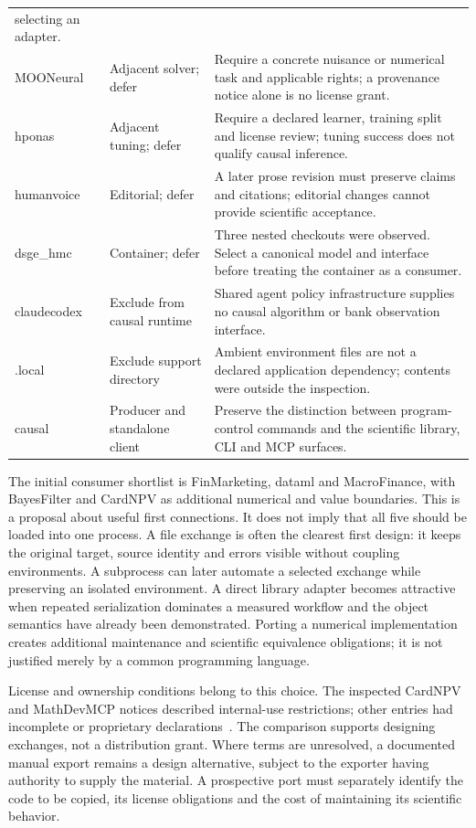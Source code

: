 \begin{longtable}{p{.21\linewidth}p{.23\linewidth}p{.47\linewidth}}
selecting an adapter. \\
MOONeural & Adjacent solver; defer & Require a concrete nuisance or numerical
task and applicable rights; a provenance notice alone is no license grant. \\
hponas & Adjacent tuning; defer & Require a declared learner, training split
and license review; tuning success does not qualify causal inference. \\
humanvoice & Editorial; defer & A later prose revision must preserve claims
and citations; editorial changes cannot provide scientific acceptance. \\
dsge\_hmc & Container; defer & Three nested checkouts were observed. Select a
canonical model and interface before treating the container as a consumer. \\
claudecodex & Exclude from causal runtime & Shared agent policy infrastructure
supplies no causal algorithm or bank observation interface. \\
.local & Exclude support directory & Ambient environment files are not a
declared application dependency; contents were outside the inspection. \\
causal & Producer and standalone client & Preserve the distinction between
program-control commands and the scientific library, CLI and MCP surfaces. \\
\bottomrule
\end{longtable}

The initial consumer shortlist is FinMarketing, dataml and MacroFinance,
with BayesFilter and CardNPV as additional numerical and value boundaries.
This is a proposal about useful first connections. It does not imply that all
five should be loaded into one process. A file exchange is often the clearest
first design: it keeps the original target, source identity and errors visible
without coupling environments. A subprocess can later automate a selected
exchange while preserving an isolated environment. A direct library adapter
becomes attractive when repeated serialization dominates a measured workflow
and the object semantics have already been demonstrated. Porting a numerical
implementation creates additional maintenance and scientific equivalence
obligations; it is not justified merely by a common programming language.

License and ownership conditions belong to this choice. The inspected
CardNPV and MathDevMCP notices described internal-use restrictions; other
entries had incomplete or proprietary declarations~\citep{v12_in_inventory}.
The comparison supports designing exchanges, not a distribution grant.
Where terms are unresolved, a documented manual export remains a design
alternative, subject to the exporter having authority to supply the material.
A prospective port must separately identify the code to be copied, its
license obligations and the cost of maintaining its scientific behavior.

